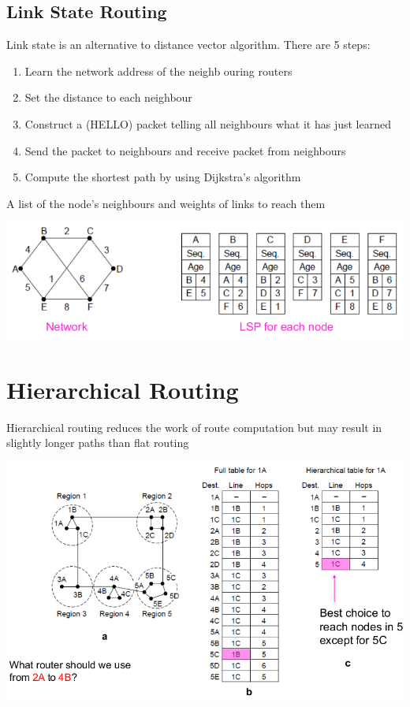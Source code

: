 \documentclass{article}[18pt]
\begin{document}
\subsection{Link State Routing}
Link state is an alternative to distance vector algorithm. There are 5 steps:
\begin{enumerate}
	\item Learn the network address of the neighb ouring routers
	\item Set the distance to each neighbour
	\item Construct a (HELLO) packet telling all neighbours what it has just learned
	\item Send the packet to neighbours and receive packet from neighbours
	\item Compute the shortest path by using Dijkstra's algorithm
\end{enumerate}
\begin{defin}
A list of the node's neighbours and weights of links to reach them
\end{defin}
\begin{center}
	\includegraphics[scale=0.7]{LSP}
\end{center}
\section{Hierarchical Routing}
Hierarchical routing reduces the work of route computation but may result in slightly longer paths than flat routing
\begin{center}
	\includegraphics[scale=0.7]{Hierarchical}
\end{center}
\end{document}
